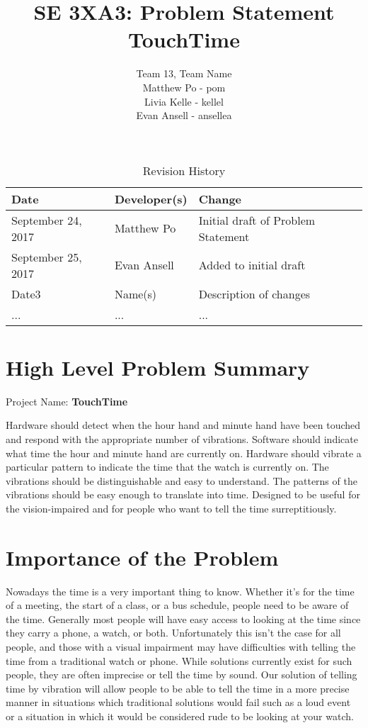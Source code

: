 \documentclass{article}
\title{SE 3XA3: Problem Statement\\TouchTime}
\author{Team 13, Team Name
		\\ Matthew Po - pom
		\\ Livia Kelle - kellel
		\\ Evan Ansell - ansellea
}
\date{}
\begin{document}
\begin{table}[hp]
\caption{Revision History} \label{TblRevisionHistory}
\begin{tabularx}{\textwidth}{llX}
\toprule
\textbf{Date} & \textbf{Developer(s)} & \textbf{Change}\\
\midrule
September 24, 2017 & Matthew Po & Initial draft of Problem Statement\\
September 25, 2017 & Evan Ansell & Added to initial draft\\
Date3 & Name(s) & Description of changes\\
... & ... & ...\\
\bottomrule
\end{tabularx}
\end{table}

\newpage

\maketitle

\section{High Level Problem Summary}
Project Name: 
\textbf{TouchTime}
\vspace{0.3cm}

Hardware should detect when the hour hand and minute hand have been touched and respond with the appropriate number of vibrations. Software should indicate what time the hour and minute hand are currently on. Hardware should vibrate a particular pattern to indicate the time that the watch is currently on. The vibrations should be distinguishable and easy to understand. The patterns of the vibrations should be easy enough to translate into time. Designed to be useful for the vision-impaired and for people who want to tell the time surreptitiously.
\vspace{0.3cm}

\section{Importance of the Problem}

Nowadays the time is a very important thing to know. Whether it's for the time of a  meeting, the start of a class, or a bus schedule, people need to be aware of the time. Generally most people will have easy access to looking at the time since they carry a phone, a watch, or both. Unfortunately this isn't the case for all people, and those with a visual impairment may have difficulties with telling the time from a traditional watch or phone. While solutions currently exist for such people, they are often imprecise or tell the time by sound. Our solution of telling time by vibration will allow people to be able to tell the time in a more precise manner in situations which traditional solutions would fail such as a loud event or a situation in which it would be considered rude to be looking at your watch.
\end{document}
